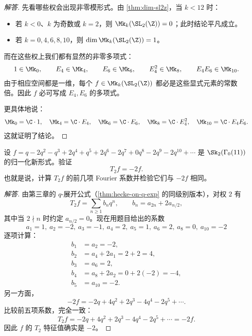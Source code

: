 \begin{proof}[解答]
先看哪些权会出现非零模形式。由 \cref{thm:dim-sl2z}，当 $k<12$ 时：
\begin{itemize}
  \item 若 $k<0$、$k$ 为奇数或 $k=2$，则 $\Mk_k(\SL_2(\Z))=0$；此时结论平凡成立。
  \item 若 $k=0,4,6,8,10$，则 $\dim \Mk_k(\SL_2(\Z))=1$。
\end{itemize}

而在这些权上我们都有显然的非零多项式：
\[
  1\in \Mk_0,
  \qquad
  E_4\in \Mk_4,
  \qquad
  E_6\in \Mk_6,
  \qquad
  E_4^2\in \Mk_8,
  \qquad
  E_4E_6\in \Mk_{10}.
\]
由于相应空间都是一维，每个 $f\in \Mk_k(\SL_2(\Z))$ 都必是这些显式元素的常数倍。因此 $f$ 必可写成 $E_4,E_6$ 的多项式。

更具体地说：
\[
  \Mk_0=\C\cdot 1,
  \quad \Mk_4=\C\cdot E_4,
  \quad \Mk_6=\C\cdot E_6,
  \quad \Mk_8=\C\cdot E_4^2,
  \quad \Mk_{10}=\C\cdot E_4E_6.
\]
这就证明了结论。
\end{proof}

\begin{exercise}
\label{ex:T2-on-level11}
设 $f=q-2q^2-q^3+2q^4+q^5+2q^6-2q^7+0q^8-2q^9-2q^{10}+\cdots$ 是 $\Sk_2(\Gamma_0(11))$ 的归一化新形式。验证
\[
  T_2f=-2f.
\]
也就是说，计算 $T_2f$ 的前几项 Fourier 系数并检验它们与 $-2f$ 相同。
\end{exercise}

\begin{proof}[解答]
由第三章的 $q$-展开公式（\cref{thm:hecke-on-q-exp} 的同级别版本），对权 $2$ 有
\[
  T_2f=\sum_{n\ge 1} b_n q^n,
  \qquad
  b_n=a_{2n}+2a_{n/2},
\]
其中当 $2\nmid n$ 时约定 $a_{n/2}=0$。现在用题目给出的系数
\[
  a_1=1,\ a_2=-2,\ a_3=-1,\ a_4=2,\ a_5=1,\ a_6=2,\ a_8=0,\ a_{10}=-2
\]
逐项计算：
\begin{align*}
  b_1&=a_2=-2,\\
  b_2&=a_4+2a_1=2+2=4,\\
  b_3&=a_6=2,\\
  b_4&=a_8+2a_2=0+2(-2)=-4,\\
  b_5&=a_{10}=-2.
\end{align*}
另一方面，
\[
  -2f=-2q+4q^2+2q^3-4q^4-2q^5+\cdots.
\]
比较前五项系数，完全一致：
\[
  T_2f=-2q+4q^2+2q^3-4q^4-2q^5+\cdots=-2f.
\]
因此 $f$ 的 $T_2$ 特征值确实是 $-2$。
\end{proof}
